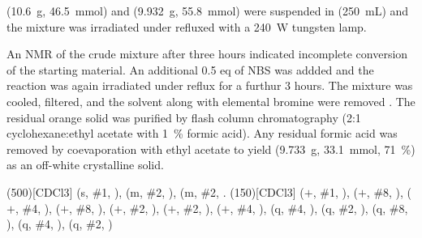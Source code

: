 \begin{experimental}[delta=(ppm),pos-number=sub,use-equal]

 (\SI{10.6}{\gram}, \SI{46.5}{\milli\mol}) and  (\SI{9.932}{\gram}, \SI{55.8}{\milli\mol}) were suspended in  (\SI{250}{\milli\L}) and the mixture was irradiated under refluxed with a \SI{240}{\watt} tungsten lamp.

An NMR of the crude mixture after three hours indicated incomplete conversion of the starting material. An additional 0.5 eq of NBS was addded and the reaction was again irradiated under reflux for a furthur 3 hours. The mixture was cooled, filtered, and the solvent along with elemental bromine were removed \invacuo. The residual orange solid was purified by flash column chromatography (2:1 cyclohexane:ethyl acetate with \SI{1}{\percent} formic acid). Any residual formic acid was removed by coevaporation with ethyl acetate to yield  (\SI{9.733}{\gram}, \SI{33.1}{\milli\mole}, \SI{71}{\percent}) as an off-white crystalline solid.

\NMR(500)[CDCl3]  (s, \#{1}, ),  (m, \#{2}, ),  (m, \#{2}, .
%
(150)[CDCl3]  ($+$, \#{1}, ),  ($+$,
\#{8}, ),  ($+$, \#{4}, ),  ($+$, \#{8},
),  ($+$, \#{2}, ),  ($+$, \#{2},
),  ($+$, \#{4}, ),  (q, \#{4},
),  (q, \#{2}, ),  (q, \#{8}, ),
 (q, \#{4}, ),  (q, \#{2}, )
%
\end{experimental}

